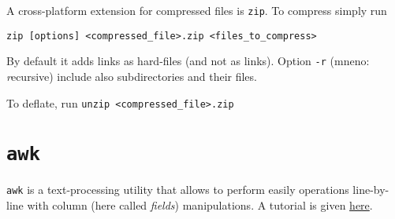 \documentclass[a4paper,12pt,%
              final%
              ]{article}
\begin{document}
\medskip
A cross-platform extension for compressed files is \texttt{zip}. To compress simply run
\begin{verbatim}
zip [options] <compressed_file>.zip <files_to_compress>
\end{verbatim}
By default it adds links as hard-files (and not as links). Option \verb|-r| (mneno: \emph{r}ecursive) include also {sub}directories and their files.

To deflate, run \verb|unzip <compressed_file>.zip|

\section{\texttt{awk}}
\label{sec:awk}
\texttt{awk} is a text-processing utility that allows to perform easily operations line-by-line with column (here called \emph{fields}) manipulations. A tutorial is given \href{https://www.tutorialspoint.com/awk/index.htm}{here}.
\end{document}
